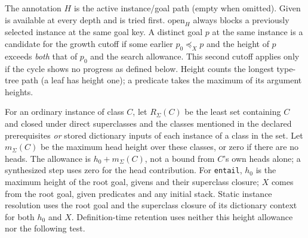 \documentclass[11pt]{article}
\theoremstyle{definition}
\newcommand{\src}[1]{\nolinkurl{#1}}
\begin{document}
The annotation $H$ is the active instance/goal path (empty when omitted).
\textsf{Given} is available at every depth and is tried first.
$\mathrm{open}_H$ always blocks a previously selected instance at the
same goal key. A distinct goal $p$ at the same instance is a candidate
for the growth cutoff if some earlier $p_0\preceq_X p$ and the height
of $p$ exceeds \emph{both} that of $p_0$ and the search allowance.
This second cutoff applies only if the cycle shows no progress as
defined below. Height counts the longest type-tree path (a leaf has
height one); a predicate takes the maximum of its argument heights.

For an ordinary instance of class $C$, let $R_\Sigma(C)$ be the least
set containing $C$ and closed under direct superclasses and the classes
mentioned in the declared prerequisites \emph{or} stored dictionary inputs
of each instance of a class in the set. Let $m_\Sigma(C)$ be the maximum
head height over these classes, or zero if there are no heads. The allowance
is $h_0+m_\Sigma(C)$, not a bound from $C$'s own heads alone; a synthesized
step uses zero for the head contribution. For \src{entail}, $h_0$ is the
maximum height of the root goal, givens and their superclass closure;
$X$ comes from the root goal, given predicates and any initial stack.
Static instance resolution uses the root goal and the superclass closure
of its dictionary context for both $h_0$ and $X$. Definition-time
retention uses neither this height allowance nor the following test.
\end{document}
